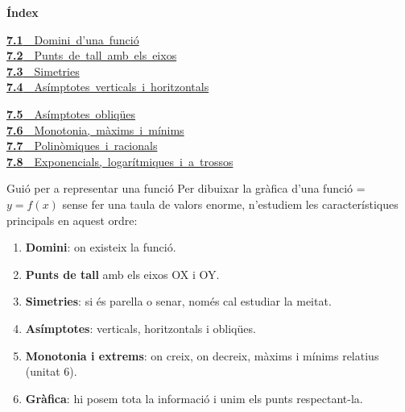 \documentclass[11pt,a4paper]{article}
\newcommand{\fmm}[1]{\setbox0=\hbox{$#1$}\ifdim\wd0>\linewidth\[#1\]\else\mbox{\box0}\fi}
\begin{document}
\begin{tcolorbox}[colback=fmsurface,colframe=fmsurface,arc=3mm,left=4mm,right=4mm,top=2mm,bottom=2mm]
\small\textbf{Índex}\par\smallskip
\begin{minipage}[t]{0.49\linewidth}\small \mbox{\hyperlink{sec1}{\textbf{\color{fmgreen}7.1}\ \ Domini d'una funció}}\\[3pt]
\mbox{\hyperlink{sec2}{\textbf{\color{fmgreen}7.2}\ \ Punts de tall amb els eixos}}\\[3pt]
\mbox{\hyperlink{sec3}{\textbf{\color{fmgreen}7.3}\ \ Simetries}}\\[3pt]
\mbox{\hyperlink{sec4}{\textbf{\color{fmgreen}7.4}\ \ Asímptotes verticals i horitzontals}}\\[3pt]\end{minipage}\hfill\begin{minipage}[t]{0.49\linewidth}\small \mbox{\hyperlink{sec5}{\textbf{\color{fmgreen}7.5}\ \ Asímptotes obliqües}}\\[3pt]
\mbox{\hyperlink{sec6}{\textbf{\color{fmgreen}7.6}\ \ Monotonia, màxims i mínims}}\\[3pt]
\mbox{\hyperlink{sec7}{\textbf{\color{fmgreen}7.7}\ \ Polinòmiques i racionals}}\\[3pt]
\mbox{\hyperlink{sec8}{\textbf{\color{fmgreen}7.8}\ \ Exponencials, logarítmiques i a trossos}}\\[3pt]\end{minipage}
\end{tcolorbox}
\vspace*{0.4cm}

\begin{fmprop}{Guió per a representar una funció}
Per dibuixar la gràfica d'una funció \fmm{y=f(x)} sense fer una taula de valors enorme, n'estudiem les característiques principals en aquest ordre:

    
\begin{enumerate}
\item \textbf{Domini}: on existeix la funció.
\item \textbf{Punts de tall} amb els eixos OX i OY.
\item \textbf{Simetries}: si és parella o senar, només cal estudiar la meitat.
\item \textbf{Asímptotes}: verticals, horitzontals i obliqües.
\item \textbf{Monotonia i extrems}: on creix, on decreix, màxims i mínims relatius (unitat 6).
\item \textbf{Gràfica}: hi posem tota la informació i unim els punts respectant-la.
\end{enumerate}
\end{fmprop}
\end{document}
